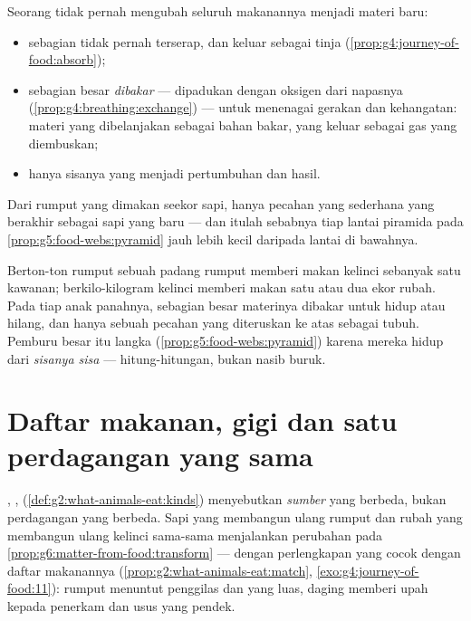 \begin{proposition}\label{prop:g6:matter-from-food:losses}
Seorang  tidak pernah mengubah seluruh makanannya menjadi
materi baru:
\begin{itemize}
  \item sebagian tidak pernah terserap, dan keluar sebagai tinja
        (\cref{prop:g4:journey-of-food:absorb});
  \item sebagian besar \emph{dibakar} --- dipadukan dengan oksigen
        dari napasnya
        (\cref{prop:g4:breathing:exchange}) --- untuk menenagai
        gerakan dan kehangatan: materi yang dibelanjakan sebagai bahan
        bakar, yang keluar sebagai gas yang diembuskan;
  \item hanya sisanya yang menjadi pertumbuhan dan hasil.
\end{itemize}
Dari rumput yang dimakan seekor sapi, hanya pecahan yang sederhana yang
berakhir sebagai sapi yang baru --- dan itulah sebabnya tiap lantai
piramida pada \cref{prop:g5:food-webs:pyramid} jauh lebih kecil
daripada lantai di bawahnya.
\end{proposition}
\admitted

\begin{example}\label{ex:g6:matter-from-food:pyramid}
Berton-ton rumput sebuah padang rumput memberi makan kelinci sebanyak
satu kawanan; berkilo-kilogram kelinci memberi makan satu atau dua
ekor rubah. Pada tiap anak panahnya, sebagian besar materinya dibakar
untuk hidup atau hilang, dan hanya sebuah pecahan yang diteruskan ke
atas sebagai tubuh. Pemburu besar itu langka
(\cref{prop:g5:food-webs:pyramid}) karena mereka hidup dari
\emph{sisanya sisa} --- hitung-hitungan, bukan nasib buruk.
\end{example}

\section{Daftar makanan, gigi dan satu perdagangan yang sama}

\begin{proposition}\label{prop:g6:matter-from-food:menus}
, , 
(\cref{def:g2:what-animals-eat:kinds}) menyebutkan \emph{sumber}
 yang berbeda, bukan perdagangan yang berbeda. Sapi yang
membangun ulang rumput dan rubah yang membangun ulang kelinci
sama-sama menjalankan perubahan pada
\cref{prop:g6:matter-from-food:transform} --- dengan perlengkapan yang
cocok dengan daftar makanannya
(\cref{prop:g2:what-animals-eat:match},
\cref{exo:g4:journey-of-food:11}): rumput menuntut penggilas dan
 yang luas, daging memberi upah kepada penerkam dan usus
yang pendek.
\end{proposition}
\admitted

